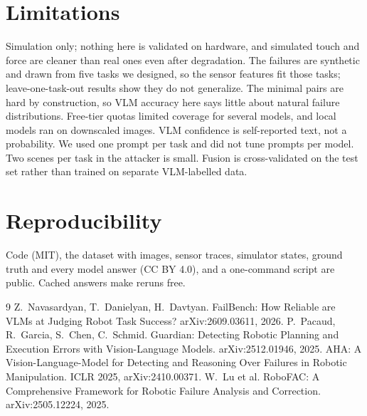 \documentclass[10pt,twocolumn]{article}
\begin{document}
\section{Limitations}
Simulation only; nothing here is validated on hardware, and simulated touch and force are cleaner than real ones even after degradation. The failures are synthetic and drawn from five tasks we designed, so the sensor features fit those tasks; leave-one-task-out results show they do not generalize. The minimal pairs are hard by construction, so VLM accuracy here says little about natural failure distributions. Free-tier quotas limited coverage for several models, and local models ran on downscaled images. VLM confidence is self-reported text, not a probability. We used one prompt per task and did not tune prompts per model. Two scenes per task in the attacker is small. Fusion is cross-validated on the test set rather than trained on separate VLM-labelled data.

\section{Reproducibility}
Code (MIT), the dataset with images, sensor traces, simulator states, ground truth and every model answer (CC BY 4.0), and a one-command script are public. Cached answers make reruns free.

\begin{thebibliography}{9}\small
{} Z.~Navasardyan, T.~Danielyan, H.~Davtyan. FailBench: How Reliable are VLMs at Judging Robot Task Success? arXiv:2609.03611, 2026.
 P.~Pacaud, R.~Garcia, S.~Chen, C.~Schmid. Guardian: Detecting Robotic Planning and Execution Errors with Vision-Language Models. arXiv:2512.01946, 2025.
 AHA: A Vision-Language-Model for Detecting and Reasoning Over Failures in Robotic Manipulation. ICLR 2025, arXiv:2410.00371.
 W.~Lu et al. RoboFAC: A Comprehensive Framework for Robotic Failure Analysis and Correction. arXiv:2505.12224, 2025.
\end{thebibliography}
\end{document}
